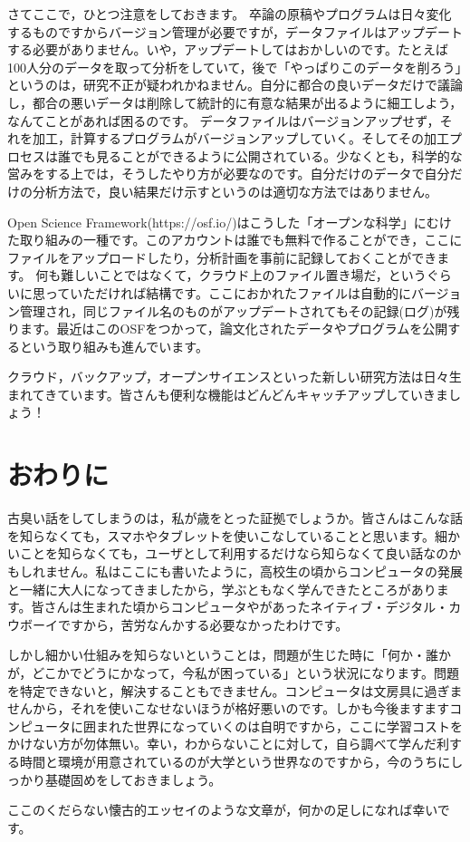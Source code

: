\documentclass{ltjsbook}
\begin{document}
さてここで，ひとつ注意をしておきます。
卒論の原稿やプログラムは日々変化するものですからバージョン管理が必要ですが，データファイルはアップデートする必要がありません。いや，アップデートしてはおかしいのです。たとえば100人分のデータを取って分析をしていて，後で「やっぱりこのデータを削ろう」というのは，研究不正が疑われかねません。自分に都合の良いデータだけで議論し，都合の悪いデータは削除して統計的に有意な結果が出るように細工しよう，なんてことがあれば困るのです。
データファイルはバージョンアップせず，それを加工，計算するプログラムがバージョンアップしていく。そしてその加工プロセスは誰でも見ることができるように公開されている。少なくとも，科学的な営みをする上では，そうしたやり方が必要なのです。自分だけのデータで自分だけの分析方法で，良い結果だけ示すというのは適切な方法ではありません。

Open Science Framework(https://osf.io/)はこうした「オープンな科学」にむけた取り組みの一種です。このアカウントは誰でも無料で作ることができ，ここにファイルをアップロードしたり，分析計画を事前に記録しておくことができます。
何も難しいことではなくて，クラウド上のファイル置き場だ，というぐらいに思っていただければ結構です。ここにおかれたファイルは自動的にバージョン管理され，同じファイル名のものがアップデートされてもその記録(ログ)が残ります。最近はこのOSFをつかって，論文化されたデータやプログラムを公開するという取り組みも進んでいます。

クラウド，バックアップ，オープンサイエンスといった新しい研究方法は日々生まれてきています。皆さんも便利な機能はどんどんキャッチアップしていきましょう！


\section{おわりに}
古臭い話をしてしまうのは，私が歳をとった証拠でしょうか。皆さんはこんな話を知らなくても，スマホやタブレットを使いこなしていることと思います。細かいことを知らなくても，ユーザとして利用するだけなら知らなくて良い話なのかもしれません。私はここにも書いたように，高校生の頃からコンピュータの発展と一緒に大人になってきましたから，学ぶともなく学んできたところがあります。皆さんは生まれた頃からコンピュータやがあったネイティブ・デジタル・カウボーイですから，苦労なんかする必要なかったわけです。

しかし細かい仕組みを知らないということは，問題が生じた時に「何か・誰かが，どこかでどうにかなって，今私が困っている」という状況になります。問題を特定できないと，解決することもできません。コンピュータは文房具に過ぎませんから，それを使いこなせないほうが格好悪いのです。しかも今後ますますコンピュータに囲まれた世界になっていくのは自明ですから，ここに学習コストをかけない方が勿体無い。幸い，わからないことに対して，自ら調べて学んだ利する時間と環境が用意されているのが大学という世界なのですから，今のうちにしっかり基礎固めをしておきましょう。

ここのくだらない懐古的エッセイのような文章が，何かの足しになれば幸いです。
\end{document}
